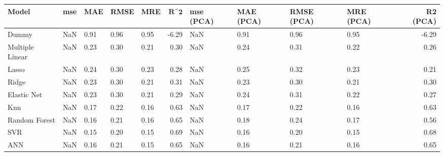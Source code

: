 \begin{table}
\centering
\label{table:iri_reg_pred}
\begin{tabular}{lllllrllllr}
\toprule
 \textbf{Model} & \textbf{mse} & \textbf{MAE} & \textbf{RMSE} & \textbf{MRE} & $\textbf{R^2}$ & \textbf{mse (PCA)} & \textbf{MAE (PCA)} & \textbf{RMSE (PCA)} & \textbf{MRE (PCA)} & \textbf{R2 (PCA)} \\
\midrule
          Dummy &          NaN &         0.91 &          0.96 &         0.95 &          -6.29 &                NaN &               0.91 &                0.96 &               0.95 &             -6.29 \\
Multiple Linear &          NaN &         0.23 &          0.30 &         0.21 &           0.30 &                NaN &               0.24 &                0.31 &               0.22 &              0.26 \\
          Lasso &          NaN &         0.24 &          0.30 &         0.23 &           0.28 &                NaN &               0.25 &                0.32 &               0.23 &              0.21 \\
          Ridge &          NaN &         0.23 &          0.30 &         0.21 &           0.31 &                NaN &               0.23 &                0.30 &               0.21 &              0.30 \\
    Elastic Net &          NaN &         0.23 &          0.30 &         0.21 &           0.29 &                NaN &               0.24 &                0.31 &               0.22 &              0.27 \\
            Knn &          NaN &         0.17 &          0.22 &         0.16 &           0.63 &                NaN &               0.17 &                0.22 &               0.16 &              0.63 \\
  Random Forest &          NaN &         0.16 &          0.21 &         0.16 &           0.65 &                NaN &               0.18 &                0.24 &               0.17 &              0.56 \\
            SVR &          NaN &         0.15 &          0.20 &         0.15 &           0.69 &                NaN &               0.16 &                0.20 &               0.15 &              0.68 \\
            ANN &          NaN &         0.16 &          0.21 &         0.15 &           0.65 &                NaN &               0.16 &                0.21 &               0.16 &              0.65 \\
\bottomrule
\end{tabular}
\end{table}
